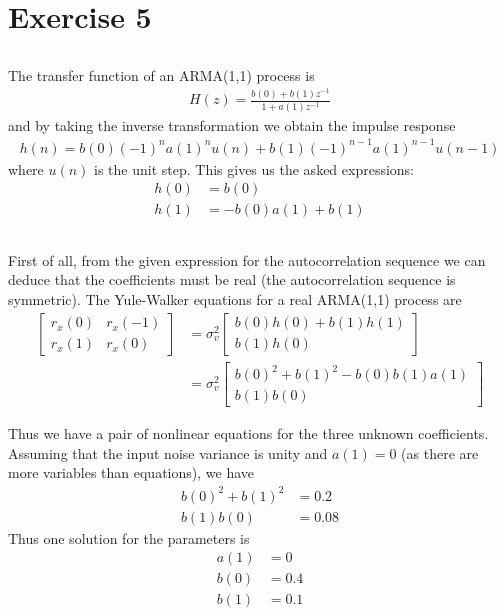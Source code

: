 
\section*{Exercise 5}

\subsection{}
The transfer function of an ARMA(1,1) process is
\begin{align}
	H(z)=\frac{b(0)+b(1)z^{-1}}{1+a(1)z^{-1}}		
\end{align}
and by taking the inverse transformation we obtain
the impulse response
\begin{align}
	h(n)=b(0)(-1)^na(1)^nu(n)+b(1)(-1)^{n-1}a(1)^{n-1}u(n-1)	
\end{align}
where $u(n)$ is the unit step. This gives us the asked expressions:
\begin{align}
	h(0)&=b(0)\\
	h(1)&=-b(0)a(1)+b(1)	
\end{align}

\subsection{}

First of all, from the given expression for the autocorrelation sequence
we can deduce that the coefficients must be real (the autocorrelation sequence is symmetric).
The Yule-Walker equations for a real ARMA(1,1) process are
\begin{align}
	\begin{bmatrix}
		r_x(0) & r_x(-1)\\
		r_x(1) & r_x(0) 
	\end{bmatrix}
	&=
	\sigma_v^2
	\begin{bmatrix}
		b(0)h(0) + b(1)h(1)\\
		b(1)h(0)
	\end{bmatrix}\\
	&=
	\sigma_v^2
	\begin{bmatrix}
		b(0)^2 + b(1)^2 - b(0)b(1)a(1)\\
		b(1)b(0)
	\end{bmatrix}	
\end{align}

Thus we have a pair of nonlinear equations for the three unknown coefficients.
Assuming that the input noise variance is unity and $a(1)=0$ (as there are more variables than equations), 
we have
\begin{align}
	b(0)^2+b(1)^2&=0.2\\
	b(1)b(0)&=0.08
	\label{b}
\end{align}
Thus one solution for the parameters is 
\begin{align}
	a(1)&=0\\
	b(0)&=0.4\\
	b(1)&=0.1
\end{align}


